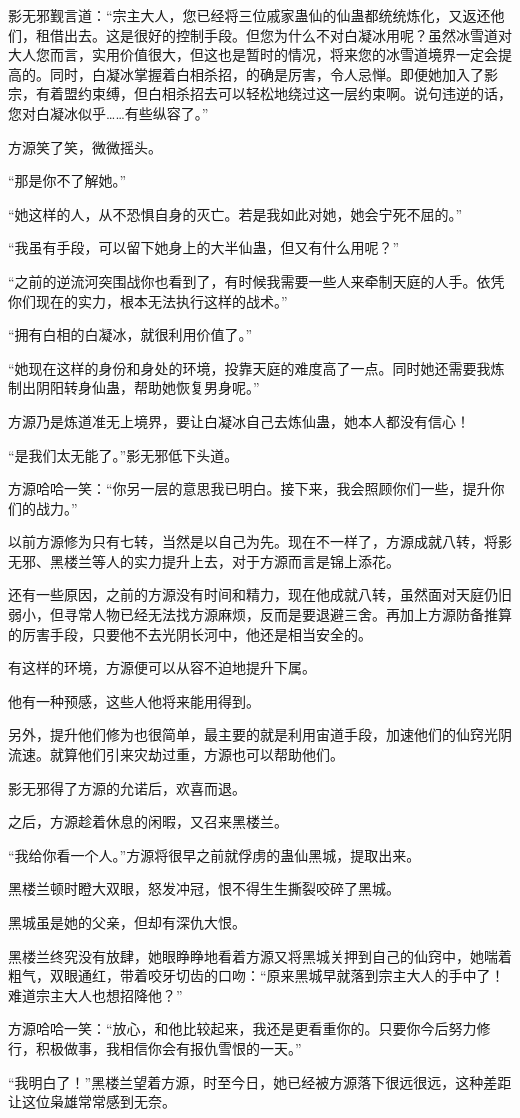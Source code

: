 \begin{this_body}
影无邪觐言道：“宗主大人，您已经将三位戚家蛊仙的仙蛊都统统炼化，又返还他们，租借出去。这是很好的控制手段。但您为什么不对白凝冰用呢？虽然冰雪道对大人您而言，实用价值很大，但这也是暂时的情况，将来您的冰雪道境界一定会提高的。同时，白凝冰掌握着白相杀招，的确是厉害，令人忌惮。即便她加入了影宗，有着盟约束缚，但白相杀招去可以轻松地绕过这一层约束啊。说句违逆的话，您对白凝冰似乎……有些纵容了。”

方源笑了笑，微微摇头。

“那是你不了解她。”

“她这样的人，从不恐惧自身的灭亡。若是我如此对她，她会宁死不屈的。”

“我虽有手段，可以留下她身上的大半仙蛊，但又有什么用呢？”

“之前的逆流河突围战你也看到了，有时候我需要一些人来牵制天庭的人手。依凭你们现在的实力，根本无法执行这样的战术。”

“拥有白相的白凝冰，就很利用价值了。”

“她现在这样的身份和身处的环境，投靠天庭的难度高了一点。同时她还需要我炼制出阴阳转身仙蛊，帮助她恢复男身呢。”

方源乃是炼道准无上境界，要让白凝冰自己去炼仙蛊，她本人都没有信心！

“是我们太无能了。”影无邪低下头道。

方源哈哈一笑：“你另一层的意思我已明白。接下来，我会照顾你们一些，提升你们的战力。”

以前方源修为只有七转，当然是以自己为先。现在不一样了，方源成就八转，将影无邪、黑楼兰等人的实力提升上去，对于方源而言是锦上添花。

还有一些原因，之前的方源没有时间和精力，现在他成就八转，虽然面对天庭仍旧弱小，但寻常人物已经无法找方源麻烦，反而是要退避三舍。再加上方源防备推算的厉害手段，只要他不去光阴长河中，他还是相当安全的。

有这样的环境，方源便可以从容不迫地提升下属。

他有一种预感，这些人他将来能用得到。

另外，提升他们修为也很简单，最主要的就是利用宙道手段，加速他们的仙窍光阴流速。就算他们引来灾劫过重，方源也可以帮助他们。

影无邪得了方源的允诺后，欢喜而退。

之后，方源趁着休息的闲暇，又召来黑楼兰。

“我给你看一个人。”方源将很早之前就俘虏的蛊仙黑城，提取出来。

黑楼兰顿时瞪大双眼，怒发冲冠，恨不得生生撕裂咬碎了黑城。

黑城虽是她的父亲，但却有深仇大恨。

黑楼兰终究没有放肆，她眼睁睁地看着方源又将黑城关押到自己的仙窍中，她喘着粗气，双眼通红，带着咬牙切齿的口吻：“原来黑城早就落到宗主大人的手中了！难道宗主大人也想招降他？”

方源哈哈一笑：“放心，和他比较起来，我还是更看重你的。只要你今后努力修行，积极做事，我相信你会有报仇雪恨的一天。”

“我明白了！”黑楼兰望着方源，时至今日，她已经被方源落下很远很远，这种差距让这位枭雄常常感到无奈。

\end{this_body}

